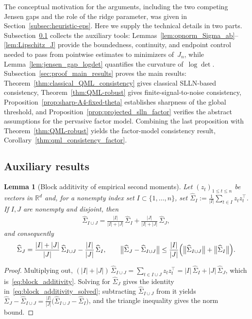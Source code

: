 \documentclass[10pt, letterpaper]{amsart}
\newtheorem{lem}[theorem]{Lemma}
\begin{document}
The conceptual motivation for the arguments, including the two competing
Jensen gaps and the role of the ridge parameter, was given in
Section~\ref{subsec:heuristic-eps}.  Here we supply the technical details in
two parts.  Subsection~\ref{sec:proof_auxiliary_results} collects the
auxiliary tools: Lemmas~\ref{lem:opnorm_Sigma_ab}--\ref{lem:Lipschitz_J}
provide the boundedness, continuity, and endpoint control needed to pass from
pointwise estimates to minimizers of~$J_n$, while
Lemma~\ref{lem:jensen_gap_logdet} quantifies the curvature of~$\log\det$.
Subsection~\ref{sec:proof_main_results} proves the main results:
Theorem~\ref{thm:classical_QML_consistency} gives classical SLLN-based
consistency, Theorem~\ref{thm:QML-robust} gives finite-signal-to-noise
consistency, Proposition~\ref{prop:sharp-A4-fixed-theta} establishes
sharpness of the global threshold, and
Proposition~\ref{prop:projected_slln_factor} verifies the abstract assumptions
for the pervasive factor model.  Combining the last proposition with
Theorem~\ref{thm:QML-robust} yields the factor-model consistency result,
Corollary~\ref{thm:qml_consistency_factor}.

\subsection{Auxiliary results}\label{sec:proof_auxiliary_results}

\begin{lem}[Block additivity of empirical second moments]\label{lem:block_additivity}
Let $(z_t)_{1\le t\le n}$ be vectors in $\mathbb R^d$ and, for a nonempty index set $I\subset\{1,\dots,n\}$, set $\widehat\Sigma_I:=\frac1{|I|}\sum_{t\in I}z_tz_t^{\top}$. If $I,J$ are nonempty and disjoint, then
\begin{align}\label{eq:block_additivity}
\widehat\Sigma_{I\cup J}
=\frac{|I|}{|I|+|J|}\,\widehat\Sigma_I+\frac{|J|}{|I|+|J|}\,\widehat\Sigma_J ,
\end{align}
and consequently
\begin{align}\label{eq:block_additivity_solved}
\widehat\Sigma_J
=\frac{|I|+|J|}{|J|}\,\widehat\Sigma_{I\cup J}-\frac{|I|}{|J|}\,\widehat\Sigma_I ,
\qquad
\bigl\|\widehat\Sigma_J-\widehat\Sigma_{I\cup J}\bigr\|
\le\frac{|I|}{|J|}\Bigl(\bigl\|\widehat\Sigma_{I\cup J}\bigr\|+\bigl\|\widehat\Sigma_I\bigr\|\Bigr).
\end{align}
\end{lem}
\begin{proof}
Multiplying out, $(|I|+|J|)\,\widehat\Sigma_{I\cup J}=\sum_{t\in I\cup J}z_tz_t^{\top}=|I|\,\widehat\Sigma_I+|J|\,\widehat\Sigma_J$, which is~\eqref{eq:block_additivity}. Solving for $\widehat\Sigma_J$ gives the identity in~\eqref{eq:block_additivity_solved}; subtracting $\widehat\Sigma_{I\cup J}$ from it yields $\widehat\Sigma_J-\widehat\Sigma_{I\cup J}=\frac{|I|}{|J|}\bigl(\widehat\Sigma_{I\cup J}-\widehat\Sigma_I\bigr)$, and the triangle inequality gives the norm bound.
\end{proof}
\end{document}
